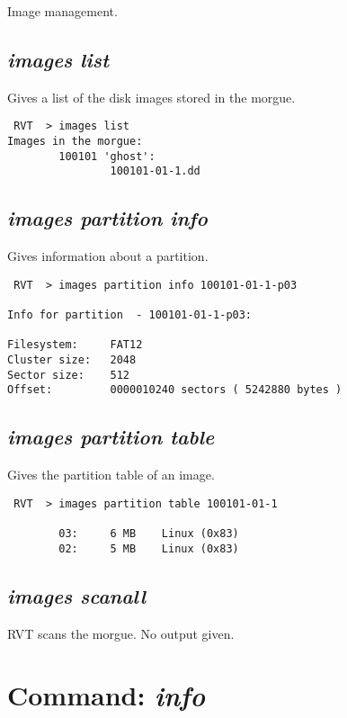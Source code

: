 \documentclass[a4paper,11pt,oneside]{report}
\begin{document}
Image management.



\subsection{\emph{images list}}

Gives a list of the disk images stored in the morgue.

\begin{verbatim}
 RVT  > images list
Images in the morgue: 
        100101 'ghost':
                100101-01-1.dd

\end{verbatim}



\subsection{\emph{images partition info}}

Gives information about a partition.

\begin{verbatim}
 RVT  > images partition info 100101-01-1-p03                                 

Info for partition  - 100101-01-1-p03:

Filesystem:     FAT12
Cluster size:   2048
Sector size:    512
Offset:         0000010240 sectors ( 5242880 bytes )
\end{verbatim}

\subsection{\emph{images partition table}}

Gives the partition table of an image.

\begin{verbatim}
 RVT  > images partition table 100101-01-1

        03:     6 MB    Linux (0x83)
        02:     5 MB    Linux (0x83)
\end{verbatim}


\subsection{\emph{images scanall}}

RVT scans the morgue. No output given. 

\section{Command: \emph{info}}
\end{document}
